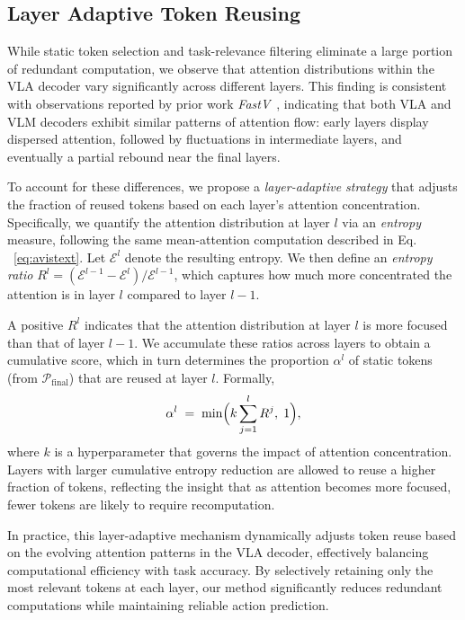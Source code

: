 \subsection{Layer Adaptive Token Reusing}
While static token selection and task-relevance filtering eliminate a large portion of redundant computation, we observe that attention distributions within the VLA decoder vary significantly across different layers. This finding is consistent with observations reported by prior work \textit{FastV}~\cite{chen2025image}, indicating that both VLA and VLM decoders exhibit similar patterns of attention flow: early layers display dispersed attention, followed by fluctuations in intermediate layers, and eventually a partial rebound near the final layers.

To account for these differences, we propose a \textit{layer-adaptive strategy} that adjusts the fraction of reused tokens based on each layer’s attention concentration. Specifically, we quantify the attention distribution at layer \(l\) via an \emph{entropy} measure, following the same mean-attention computation described in Eq. ~\ref{eq:avistext}. Let \(\mathcal{E}^l\) denote the resulting entropy. We then define an \emph{entropy ratio} \(R^l=(\mathcal{E}^{l-1} - \mathcal{E}^l)/\mathcal{E}^{l-1}\), which captures how much more concentrated the attention is in layer \(l\) compared to layer \(l-1\).

A positive $R^l$ indicates that the attention distribution at layer $l$ is more focused than that of layer $l-1$. We accumulate these ratios across layers to obtain a cumulative score, which in turn determines the proportion \(\alpha^l\) of static tokens (from \(\mathcal{P}_{\mathrm{final}}\)) that are reused at layer \(l\). Formally,
\begin{equation}
\label{eq:reuse_ratio}
\alpha^l \;=\; \min\Bigl(k \sum_{j=1}^l R^j,\; 1\Bigr),
\end{equation}
where \(k\) is a hyperparameter that governs the impact of attention concentration. Layers with larger cumulative entropy reduction are allowed to reuse a higher fraction of tokens, reflecting the insight that as attention becomes more focused, fewer tokens are likely to require recomputation.

In practice, this layer-adaptive mechanism dynamically adjusts token reuse based on the evolving attention patterns in the VLA decoder, effectively balancing computational efficiency with task accuracy. By selectively retaining only the most relevant tokens at each layer, our method significantly reduces redundant computations while maintaining reliable action prediction. 

